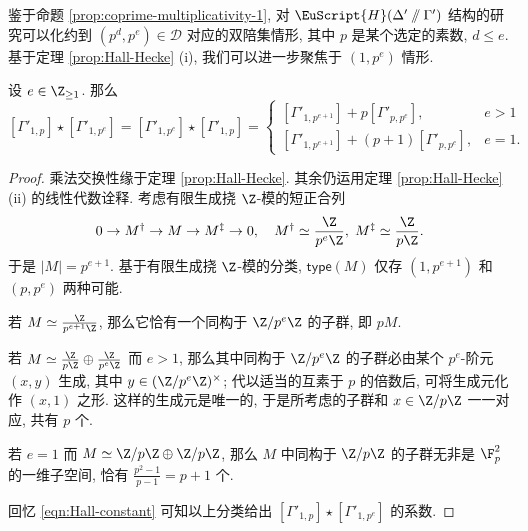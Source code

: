 鉴于命题 \ref{prop:coprime-multiplicativity-1}, 对 $\EuScript{H}(\Delta' \sslash \Gamma')$ 结构的研究可以化约到 $(p^d, p^e) \in \mathcal{D}$ 对应的双陪集情形, 其中 $p$ 是某个选定的素数, $d \leq e$. 基于定理 \ref{prop:Hall-Hecke} (i), 我们可以进一步聚焦于 $(1, p^e)$ 情形.

\begin{proposition}\label{prop:prime-coset-mult-1}
	设 $e \in \Z_{\geq 1}$. 那么
	\[ \left[ \Gamma'_{1,p} \right] \star \left[ \Gamma'_{1, p^e} \right] = \left[ \Gamma'_{1, p^e} \right] \star \left[ \Gamma'_{1,p} \right] =
	\begin{cases}
		\left[ \Gamma'_{1,p^{e+1}} \right] + p \left[ \Gamma'_{p, p^e} \right], & e > 1 \\
		\left[ \Gamma'_{1,p^{e+1}} \right] + (p+1) \left[ \Gamma'_{p, p^e} \right], & e = 1.
	\end{cases}\]
\end{proposition}
\begin{proof}
	乘法交换性缘于定理 \ref{prop:Hall-Hecke}. 其余仍运用定理 \ref{prop:Hall-Hecke} (ii) 的线性代数诠释. 考虑有限生成挠 $\Z$-模的短正合列
	\[ 0 \to M^\dagger \to M \to M^\ddagger \to 0, \quad M^\dagger \simeq \frac{\Z}{p^e \Z}, \; M^\ddagger \simeq \frac{\Z}{p\Z}. \]
	于是 $|M| = p^{e+1}$. 基于有限生成挠 $\Z$-模的分类, $\mathsf{type}(M)$ 仅存 $(1, p^{e+1})$ 和 $(p,p^e)$ 两种可能.
	\begin{compactitem}
		\item 若 $M \simeq \frac{\Z}{p^{e+1}\Z}$, 那么它恰有一个同构于 $\Z/p^e \Z$ 的子群, 即 $pM$.
		\item 若 $M \simeq \frac{\Z}{p\Z} \oplus \frac{\Z}{p^e \Z}$ 而 $e > 1$, 那么其中同构于 $\Z/p^e \Z$ 的子群必由某个 $p^e$-阶元 $(x,y)$ 生成, 其中 $y \in (\Z/p^e \Z)^\times$; 代以适当的互素于 $p$ 的倍数后, 可将生成元化作 $(x, 1)$ 之形. 这样的生成元是唯一的, 于是所考虑的子群和 $x \in \Z/p\Z$ 一一对应, 共有 $p$ 个.
		\item 若 $e = 1$ 而 $M \simeq \Z/p\Z \oplus \Z/p\Z$, 那么 $M$ 中同构于 $\Z/p\Z$ 的子群无非是 $\F_p^2$ 的一维子空间, 恰有 $\frac{p^2 - 1}{p - 1} = p + 1$ 个.
	\end{compactitem}
	回忆 \eqref{eqn:Hall-constant} 可知以上分类给出 $\left[ \Gamma'_{1,p} \right] \star \left[ \Gamma'_{1, p^e} \right]$ 的系数.
\end{proof}

